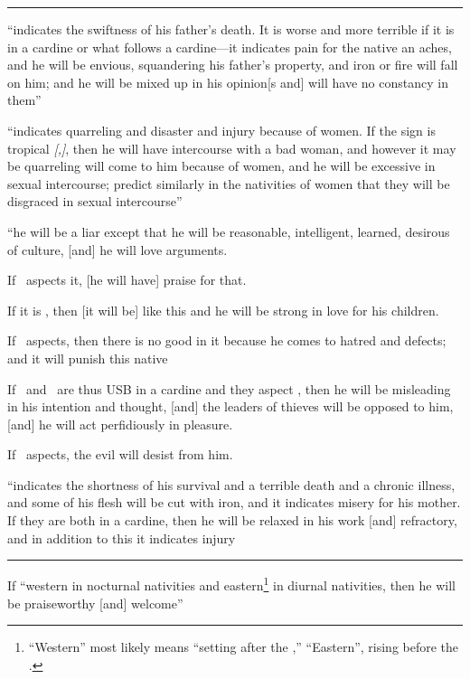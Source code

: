 \begin{description}[style=multiline,leftmargin=1.5cm]
\vspace{0.5em}\hrule
\item[\Mars,\Sun]
``indicates the swiftness of his father's death. It is worse and more terrible if it is in a cardine or what follows a cardine---it indicates pain for the native an aches, and he will be envious, squandering his father's property, and iron or fire will fall on him; and he will be mixed up in his opinion[s and] will have no constancy in them''

\item[\Mars,\Venus]
``indicates quarreling and disaster and injury because of women. If the sign is tropical \textsl{[\Aries,\Libra]}, then he will have intercourse with a bad woman, and however it may be quarreling will come to him because of women, and he will be excessive in sexual intercourse; predict similarly in the nativities of women that they will be disgraced in sexual intercourse''

\item[\Mars,\Mercury]
``he will be a liar except that he will be reasonable, intelligent, learned, desirous of culture, [and] he will love arguments. 

If \Jupiter\, aspects it, [he will have] praise for that. 

If it is \Venus, then [it will be] like this and he will be strong in love for his children. 

If \Saturn\, aspects, then there is no good in it because he comes to hatred and defects; and it will punish this native

If \Mercury\, and \Mars\, are thus USB in a cardine and they aspect \Venus, then he will be misleading in his intention and thought, [and] the leaders of thieves will be opposed to him, [and] he will act perfidiously in pleasure.

If \Jupiter\, aspects, the evil will desist from him.

\item[\Mars,\Moon]
``indicates the shortness of his survival and a terrible death and a chronic illness, and some of his flesh will be cut with iron, and it indicates misery for his mother. If they are both in a cardine, then he will be relaxed in his work [and] refractory, and in addition to this it indicates injury

\vspace{0.5em}\hrule
\item[\Sun,\Venus]
If ``western in nocturnal nativities and eastern\footnote{``Western'' most likely means ``setting after the \Sun,'' ``Eastern'', rising before the \Sun.} in diurnal nativities, then he will be praiseworthy [and] welcome''


\end{description}
